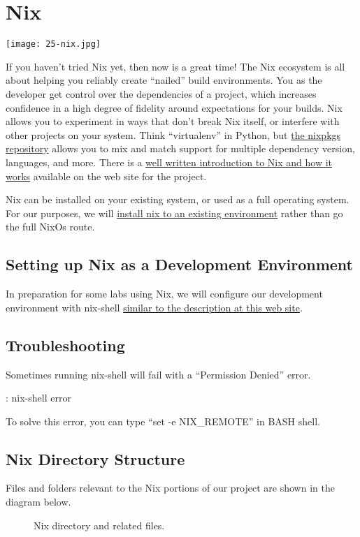 \chapter{Nix}

\texttt{[image: 25-nix.jpg]}

\justifying
If you haven't tried Nix yet, then now is a great time! The Nix ecosystem is all about
helping you reliably create ``nailed'' build environments. You as the developer get control over
the dependencies of a project, which increases  confidence in a high degree of fidelity around
expectations for your builds. Nix allows you to experiment in ways that don't break Nix itself,
or interfere with other projects on your system. Think ``virtualenv'' in Python,
but \href{https://github.com/NixOS/nixpkgs/tree/master/pkgs}{the nixpkgs repository}
allows you to mix and match support for multiple dependency version, languages, and more. There is a  \href{https://nixos.org/guides/how-nix-works.html}{well written introduction to Nix and how it works} available
on the web site for the project.

\justifying
Nix can be installed on your existing system, or used as a full operating system. For our purposes, we will
\href{https://nixos.org/download.html}{install nix to an existing environment} rather than go the full NixOs route.

\section{Setting up Nix as a Development Environment}

\justifying
In preparation for some labs using Nix, we will configure our development environment with nix-shell \href{https://nixos.wiki/wiki/Development_environment_with_nix-shell}{similar to the description at this web site}.

\section{Troubleshooting}

\justifying
Sometimes running nix-shell will fail with a ``Permission Denied'' error.

\begin{mybox}{\thetcbcounter: nix-shell error}
	
	\label{nixerr}
\end{mybox}

\justifying
To solve this error, you can type ``set -e NIX\_REMOTE'' in BASH shell.



\section{Nix Directory Structure}
\justifying
Files and folders relevant to the Nix portions of our project are shown in the diagram below.

\begin{figure}[!htb]
	\centering
	
	\caption{Nix directory and related files.}
	\label{nixfiles}
\end{figure}
